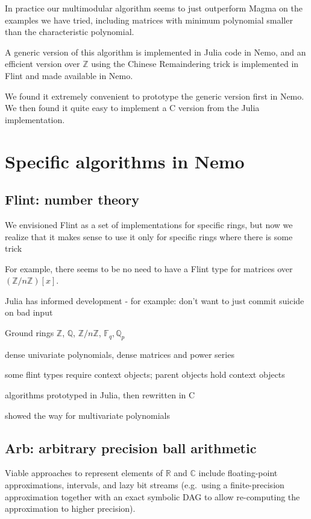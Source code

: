 \documentclass{sig-alternate-05-2015}
\begin{document}
In practice our multimodular algorithm seems to just outperform Magma on the
examples we have tried, including matrices with minimum polynomial smaller 
than the characteristic polynomial.

A generic version of this algorithm is implemented in Julia code in Nemo, and
an efficient version over $\mathbb{Z}$ using the Chinese Remaindering trick
is implemented in Flint and made available in Nemo.

We found it extremely convenient to prototype the generic version first in
Nemo. We then found it quite easy to implement a C version from the Julia
implementation.

\section{Specific algorithms in Nemo}

\subsection{Flint: number theory}

We envisioned Flint as a set of implementations for specific rings,
but now we realize that it makes sense to use it only for specific
rings where there is some trick

For example, there seems to be no need to have a Flint type for
matrices over $\left(\mathbb{Z}/n\mathbb{Z}\right)[x]$.

Julia has informed development - for example: don't want to just commit suicide
on bad input

Ground rings $\mathbb{Z}$, $\mathbb{Q}$, $\mathbb{Z}/n\mathbb{Z}$,
$\mathbb{F}_q, \mathbb{Q}_p$

dense univariate polynomials, dense matrices
and power series

some flint types require context objects; parent objects hold context objects

algorithms prototyped in Julia, then rewritten in C

showed the way for multivariate polynomials 

\subsection{Arb: arbitrary precision ball arithmetic}

Viable approaches to represent elements of $\mathbb{R}$ and $\mathbb{C}$
include floating-point approximations,
intervals, and lazy bit streams (e.g.\ using a finite-precision
approximation together with an exact symbolic DAG
to allow re-computing the approximation to higher precision).
\end{document}
